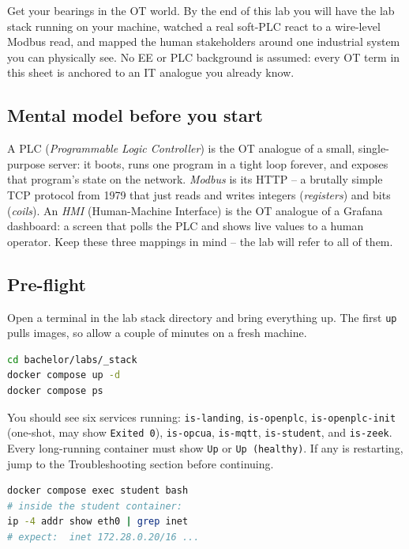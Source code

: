 \documentclass[11pt,a4paper]{article}
\begin{document}
\labheader

\begin{goalbox}
Get your bearings in the OT world. By the end of this lab you will have
the lab stack running on your machine, watched a real soft-PLC react to
a wire-level Modbus read, and mapped the human stakeholders around one
industrial system you can physically see. No EE or PLC background is
assumed: every OT term in this sheet is anchored to an IT analogue you
already know.
\end{goalbox}

\subsection*{Mental model before you start}
A PLC (\emph{Programmable Logic Controller}) is the OT analogue of a
small, single-purpose server: it boots, runs one program in a tight
loop forever, and exposes that program's state on the network.
\emph{Modbus} is its HTTP -- a brutally simple TCP protocol from 1979
that just reads and writes integers (\emph{registers}) and bits
(\emph{coils}). An \emph{HMI} (Human-Machine Interface) is the OT
analogue of a Grafana dashboard: a screen that polls the PLC and shows
live values to a human operator. Keep these three mappings in mind --
the lab will refer to all of them.

\subsection*{Pre-flight}
Open a terminal in the lab stack directory and bring everything up.
The first \texttt{up} pulls images, so allow a couple of minutes on a
fresh machine.

\begin{lstlisting}[language=bash]
cd bachelor/labs/_stack
docker compose up -d
docker compose ps
\end{lstlisting}

You should see six services running: \texttt{is-landing},
\texttt{is-openplc}, \texttt{is-openplc-init} (one-shot, may show
\texttt{Exited 0}), \texttt{is-opcua}, \texttt{is-mqtt},
\texttt{is-student}, and \texttt{is-zeek}. Every long-running container
must show \texttt{Up} or \texttt{Up (healthy)}. If any is restarting,
jump to the Troubleshooting section before continuing.

\begin{lstlisting}[language=bash]
docker compose exec student bash
# inside the student container:
ip -4 addr show eth0 | grep inet
# expect:  inet 172.28.0.20/16 ...
\end{lstlisting}
\end{document}
